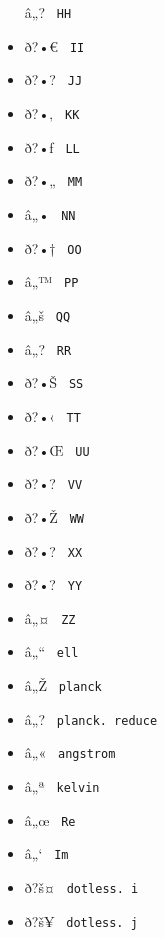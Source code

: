 \begin{itemize}
  \label{symbol-HH}{{ â„? } \texttt{\ HH\ }}
\item
  \label{symbol-II}{{ ð?•€ } \texttt{\ II\ }}
\item
  \label{symbol-JJ}{{ ð?•? } \texttt{\ JJ\ }}
\item
  \label{symbol-KK}{{ ð?•‚ } \texttt{\ KK\ }}
\item
  \label{symbol-LL}{{ ð?•ƒ } \texttt{\ LL\ }}
\item
  \label{symbol-MM}{{ ð?•„ } \texttt{\ MM\ }}
\item
  \label{symbol-NN}{{ â„• } \texttt{\ NN\ }}
\item
  \label{symbol-OO}{{ ð?•† } \texttt{\ OO\ }}
\item
  \label{symbol-PP}{{ â„™ } \texttt{\ PP\ }}
\item
  \label{symbol-QQ}{{ â„š } \texttt{\ QQ\ }}
\item
  \label{symbol-RR}{{ â„? } \texttt{\ RR\ }}
\item
  \label{symbol-SS}{{ ð?•Š } \texttt{\ SS\ }}
\item
  \label{symbol-TT}{{ ð?•‹ } \texttt{\ TT\ }}
\item
  \label{symbol-UU}{{ ð?•Œ } \texttt{\ UU\ }}
\item
  \label{symbol-VV}{{ ð?•? } \texttt{\ VV\ }}
\item
  \label{symbol-WW}{{ ð?•Ž } \texttt{\ WW\ }}
\item
  \label{symbol-XX}{{ ð?•? } \texttt{\ XX\ }}
\item
  \label{symbol-YY}{{ ð?•? } \texttt{\ YY\ }}
\item
  \label{symbol-ZZ}{{ â„¤ } \texttt{\ ZZ\ }}
\item
  \label{symbol-ell}{{ â„`` } \texttt{\ ell\ }}
\item
  \label{symbol-planck}{{ â„Ž } \texttt{\ planck\ }}
\item
  \label{symbol-planck.reduce}{{ â„? }
  \texttt{\ planck.\ reduce\ }}
\item
  \label{symbol-angstrom}{{ â„« } \texttt{\ angstrom\ }}
\item
  \label{symbol-kelvin}{{ â„ª } \texttt{\ kelvin\ }}
\item
  \label{symbol-Re}{{ â„œ } \texttt{\ Re\ }}
\item
  \label{symbol-Im}{{ â„` } \texttt{\ Im\ }}
\item
  \label{symbol-dotless.i}{{ ð?š¤ }
  \texttt{\ dotless.\ i\ }}
\item
  \label{symbol-dotless.j}{{ ð?š¥ }
  \texttt{\ dotless.\ j\ }}
\end{itemize}

